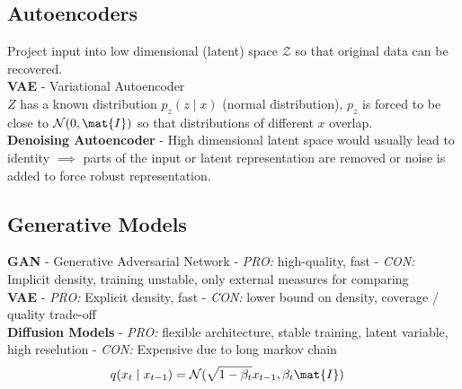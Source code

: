 \begin{multicols}{2}
\begin{mdframed}[style=eqbox]
        \subsection{Autoencoders}
        Project input into low dimensional (latent) space $\mathcal{Z}$ so that original data can be recovered.\\
        \textbf{VAE} - Variational Autoencoder\\
        $Z$ has a known distribution $p_z(z \mid x)$ (normal distribution), $p_z$ is forced to be close to $\mathcal{N}(0, \mat{I})$ so that distributions of different $x$ overlap.\\
        \textbf{Denoising Autoencoder} - High dimensional latent space would usually lead to identity $\implies$ parts of the input or latent representation are removed or noise is added to force robust representation.\\
    \end{mdframed}

    \begin{mdframed}[style=eqbox]
        \subsection{Generative Models}
        \textbf{GAN} - Generative Adversarial Network - \textit{PRO:} high-quality, fast - \textit{CON:} Implicit density, training unstable, only external measures for comparing\\
        \textbf{VAE} - \textit{PRO:} Explicit density, fast - \textit{CON:} lower bound on density, coverage / quality trade-off\\
        \textbf{Diffusion Models} - \textit{PRO:} flexible architecture, stable training, latent variable, high reselution - \textit{CON:} Expensive due to long markov chain
        \begin{align*}
            q(x_t \mid x_{t-1}) &= \mathcal{N}(\sqrt{1-\beta_t}x_{t-1},\beta_t \mat{I})
        \end{align*}
    \end{mdframed}
\vfill\null
\end{multicols}

